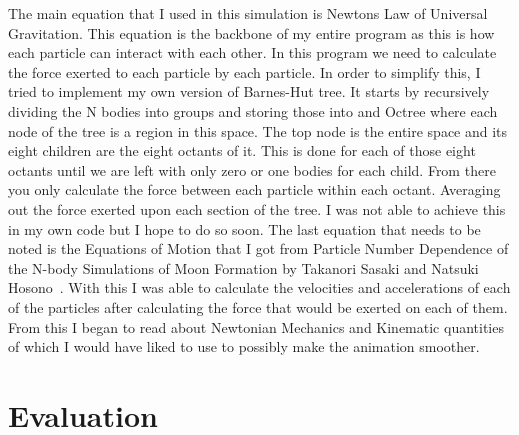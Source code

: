 \documentclass{egpubl}
\begin{document}
    The main equation that I used in this simulation is Newtons Law of Universal Gravitation. This equation is the backbone of my entire program as this is how each particle can interact with each other. In this program we need to calculate the force exerted to each particle by each particle. In order to simplify this, I tried to implement my own version of Barnes-Hut tree. It starts by recursively dividing the N bodies into groups and storing those into and Octree where each node of the tree is a region in this space. The top node is the entire space and its eight children are the eight octants of it. This is done for each of those eight octants until we are left with only zero or one bodies for each child. From there you only calculate the force between each particle within each octant. Averaging out the force exerted upon each section of the tree. I was not able to achieve this in my own code but I hope to do so soon. The last equation that needs to be noted is the Equations of Motion that I got from Particle Number Dependence of the N-body Simulations of Moon Formation by Takanori Sasaki and Natsuki Hosono~\cite{sasaki2018particle}. With this I was able to calculate the velocities and accelerations of each of the particles after calculating the force that would be exerted on each of them. From this I began to read about Newtonian Mechanics and Kinematic quantities of which I would have liked to use to possibly make the animation smoother.

\section{Evaluation}
\end{document}
